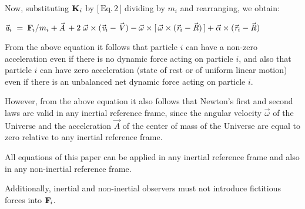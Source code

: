 \documentclass[10pt]{article}
\begin{document}
\par \bigskip \noindent Now, substituting ${\mathbf{K}}_{\hspace{+0.009em}i}$ by \hyperlink{e1p2}{$\big[\,{\mathrm{Eq.\,2}}\,\big]$} dividing by $m_i$ and rearranging, we obtain:

\par \bigskip ${\vec{\mathit{a}}}_{i} \;=\: {\mathbf{F}}_{\hspace{-0.09em}i}/m_i + {\vec{\mathit{A}}} \hspace{+0.15em} + 2 \; {\vec{\omega}} \times ({\vec{\mathit{v}}}_{i} - {\vec{\mathit{V}}}) - {\vec{\omega}} \times [ \, {\vec{\omega}} \times ({\vec{\mathit{r}}}_{i} - {\vec{\mathit{R}}}) \, ] + {\vec{\alpha}} \times ({\vec{\mathit{r}}}_{i} - {\vec{\mathit{R}}})$

\par \bigskip \noindent From the above equation it follows that particle $i$ can have a non-zero acceleration even if there is no dynamic force acting on particle $i$, and also that particle $i$ can have zero acceleration (state of rest or of uniform linear motion) even if there is an unbalanced net dynamic force acting on particle $i$.

\par \bigskip \noindent However, from the above equation it also follows that Newton's first and second laws are valid in any inertial reference frame, since the angular velocity ${\vec{\omega}}$ of the Universe and the acceleration ${\vec{\mathit{A}}}$ of the center of mass of the Universe are equal to zero relative to any inertial reference frame.

\vspace{+0.60em}

\par {}

\par \bigskip \noindent All equations of this paper can be applied in any inertial reference frame and also in any non-inertial reference frame.

\par \bigskip \noindent Additionally, inertial and non-inertial observers must not introduce fictitious forces into ${\mathbf{F}}_{\hspace{-0.09em}i}$.
\end{document}
